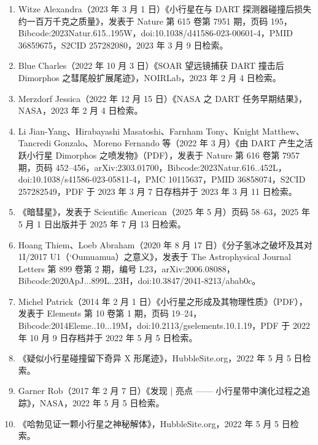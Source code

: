 \begin{enumerate}
\item Witze Alexandra（2023 年 3 月 1 日）《小行星在与 DART 探测器碰撞后损失约一百万千克之质量》，发表于 Nature 第 615 卷第 7951 期，页码 195，Bibcode:2023Natur.615..195W，doi:10.1038/d41586-023-00601-4，PMID 36859675，S2CID 257282080，2023 年 3 月 9 日检索。

\item Blue Charles（2022 年 10 月 3 日）《SOAR 望远镜捕获 DART 撞击后 Dimorphos 之彗尾般扩展尾迹》，NOIRLab，2023 年 2 月 4 日检索。

\item Merzdorf Jessica（2022 年 12 月 15 日）《NASA 之 DART 任务早期结果》，NASA，2023 年 2 月 4 日检索。

\item Li Jian-Yang、Hirabayashi Masatoshi、Farnham Tony、Knight Matthew、Tancredi Gonzalo、Moreno Fernando 等（2022 年 3 月）《由 DART 产生之活跃小行星 Dimorphos 之喷发物》（PDF），发表于 Nature 第 616 卷第 7957 期，页码 452–456，arXiv:2303.01700，Bibcode:2023Natur.616..452L，doi:10.1038/s41586-023-05811-4，PMC 10115637，PMID 36858074，S2CID 257282549，PDF 于 2023 年 3 月 7 日存档并于 2023 年 3 月 11 日检索。

\item 《暗彗星》，发表于 Scientific American（2025 年 5 月）页码 58–63，2025 年 5 月 1 日出版并于 2025 年 7 月 13 日检索。

\item Hoang Thiem、Loeb Abraham（2020 年 8 月 17 日）《分子氢冰之破坏及其对 1I/2017 U1（‘Oumuamua）之意义》，发表于 The Astrophysical Journal Letters 第 899 卷第 2 期，编号 L23，arXiv:2006.08088，Bibcode:2020ApJ...899L..23H，doi:10.3847/2041-8213/abab0c。

\item Michel Patrick（2014 年 2 月 1 日）《小行星之形成及其物理性质》（PDF），发表于 Elements 第 10 卷第 1 期，页码 19–24，Bibcode:2014Eleme..10...19M，doi:10.2113/gselements.10.1.19，PDF 于 2022 年 10 月 9 日存档并于 2022 年 5 月 5 日检索。

\item 《疑似小行星碰撞留下奇异 X 形尾迹》，HubbleSite.org，2022 年 5 月 5 日检索。

\item Garner Rob（2017 年 2 月 7 日）《发现 | 亮点 —— 小行星带中演化过程之追踪》，NASA，2022 年 5 月 5 日检索。

\item 《哈勃见证一颗小行星之神秘解体》，HubbleSite.org，2022 年 5 月 5 日检索。


\end{enumerate}

